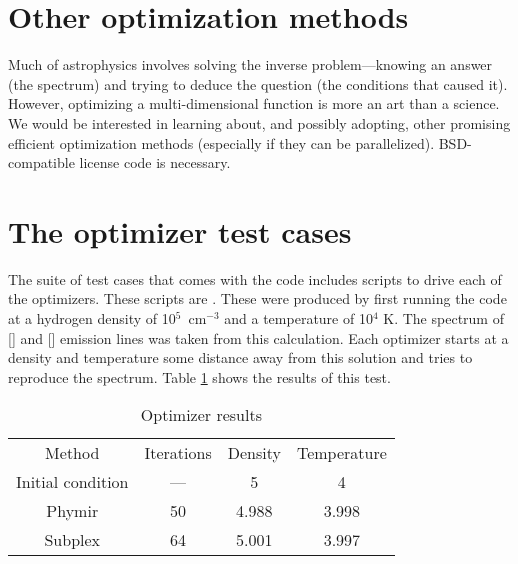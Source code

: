 \section{Other optimization methods}

Much of astrophysics involves solving the inverse problem---knowing an
answer (the spectrum) and trying to deduce the question (the conditions
that caused it).
However, optimizing a multi-dimensional function is more an art
than a science.
We would be interested in learning about,
and possibly adopting, other promising efficient optimization methods
(especially if they can be parallelized).
BSD-compatible license code is necessary.

\section{The optimizer test cases}

The suite of test cases that comes with the code includes scripts to
drive each of the optimizers.
These scripts are .
These were
produced by first running the code at a hydrogen density of 10$^5$~cm$^{-3}$ and
a temperature of 10$^4$ K.
The spectrum of [\oii] and [\oiii] emission lines
was taken from this calculation.
Each optimizer starts at a density and
temperature some distance away from this solution and tries to reproduce
the spectrum.
Table \ref{tab:OptimizerResults} shows the results of this test.

\begin{table}
\label{tab:OptimizerResults}
\centering
\caption{Optimizer results}
\begin{tabular}{cccc}
\hline
Method& Iterations& Density& Temperature\\
Initial
condition& ---& 5& 4\\
Phymir& 50& 4.988& 3.998\\
Subplex& 64& 5.001& 3.997\\
\hline
\end{tabular}
\end{table}



